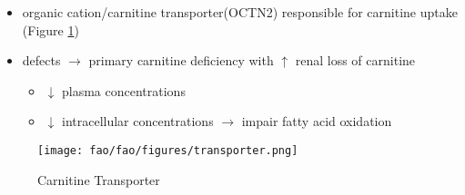 \documentclass{scrartcl}
\begin{document}
\begin{enumerate}
\begin{enumerate}
\label{sec:org5ea5f81}
\begin{itemize}
\item organic cation/carnitine transporter(OCTN2) responsible for
carnitine uptake (Figure \ref{fig:org600dd1c})
\item defects \(\to\) primary carnitine deficiency with \(\uparrow\) renal loss of carnitine
\begin{itemize}
\item \(\downarrow\) plasma concentrations
\item \(\downarrow\) intracellular concentrations \(\to\) impair fatty acid
oxidation
\end{itemize}
\end{itemize}

\begin{figure}[htbp]
\centering
\texttt{[image: fao/fao/figures/transporter.png]}
\caption{\label{fig:org600dd1c}Carnitine Transporter}
\end{figure}


\end{enumerate}
\end{enumerate}
\end{document}
